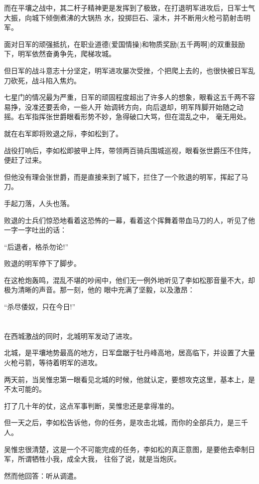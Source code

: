 \documentclass[11pt,a4paper,onecolumn]{article}
\begin{document}
而在平壤之战中，其二杆子精神更是发挥到了极致，在打退明军进攻后，日军士气大振，向城下倾倒煮沸的大锅热
水，投掷巨石、滚木，并不断用火枪弓箭射击明军。

面对日军的顽强抵抗，在职业道德(爱国情操)和物质奖励(五千两啊)的双重鼓励下，明军依然奋勇争先，爬梯攻城。

但日军的战斗意志十分坚定，明军进攻屡次受挫，个把爬上去的，也很快被日军乱刀砍死，战斗陷入焦灼。

七星门的情况最为严重，日军的顽固程度超出了许多人的想象，眼看这五千两不容易挣，没准还要丢命，一些人开
始调转方向，向后退却，明军阵脚开始随之动摇。右军指挥张世爵眼看形势不妙，急得破口大骂，但在混乱之中，
毫无用处。

就在右军即将败退之际，李如松到了。

战役打响后，李如松即披甲上阵，带领两百骑兵围城巡视，眼看张世爵压不住阵，便赶了过来。

但他没有理会张世爵，而是直接来到了城下，拦住了一个败退的明军，挥起了马刀。

手起刀落，人头也落。

败退的士兵们惊恐地看着这恐怖的一幕，看着这个挥舞着带血马刀的人，听见了他一字一字吐出的话：

``后退者，格杀勿论!''

败退的明军停下了脚步。

在这枪炮轰鸣，混乱不堪的吵闹中，他们无一例外地听见了李如松那音量不大，却极为清晰的声音。那一刻，他的
眼中充满了坚毅，以及激昂：

``杀尽倭奴，只在今日!''

\section[\thesection]{}

在西城激战的同时，北城明军发动了进攻。

北城，是平壤地势最高的地方，日军盘踞于牡丹峰高地，居高临下，并设置了大量火枪弓箭，等待着明军的进攻。

两天前，当吴惟忠第一眼看见北城的时候，他就认定，要想攻克这里，基本上，是不太可能的。

打了几十年的仗，这点军事判断，吴惟忠还是拿得准的。

但一天之后，李如松告诉他，你的任务，是攻击北城，而你的全部兵力，是三千人。

吴惟忠很清楚，这是一个不可能完成的任务，李如松的真正意图，是要他去牵制日军，所谓牺牲小我，成全大我，
往俗了说，就是当炮灰。

然而他回答：听从调遣。
\end{document}
